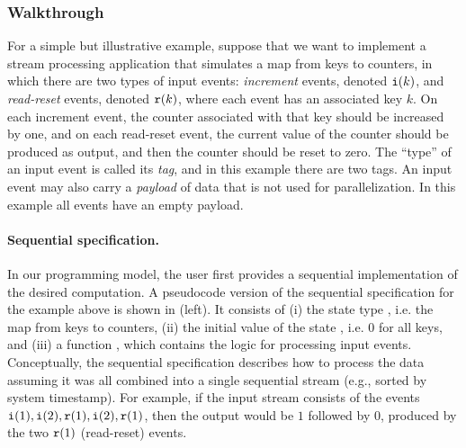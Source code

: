 \subsubsection{Walkthrough}

For a simple but illustrative example, suppose that we want to
implement a stream processing application that simulates a map from
keys to counters, in which there are two types of input events: \emph{increment}
events, denoted $\texttt{i}(k)$, and \emph{read-reset} events, denoted
$\texttt{r}(k)$, where each event has an associated key $k$.  On each
increment event, the counter associated with that key should be
increased by one, and on each read-reset event, the current value of
the counter should be produced as output, and then the counter should be reset to
zero.
The ``type'' of an input event is called its \emph{tag}, and in this example there are
two tags.
An input event may also carry a \emph{payload} of data that is not
used for parallelization. In this example all events have an empty payload.

\paragraph{Sequential specification.}
\label{p:seq-impl}
In our programming model, the user first provides a sequential
implementation of the desired computation.
A pseudocode version of the sequential specification for the
example above is shown in  (left). It consists of
(i) the state type , i.e. the map from keys to
counters, (ii) the initial value of the state ,
i.e. $0$ for all keys, and (iii) a function ,
which contains the logic for processing input events.
Conceptually, the sequential specification describes how to process
the data assuming it was all combined into a single sequential stream (e.g.,
sorted by system timestamp).  For example, if the input stream
consists of the events $\texttt{i}(1), \texttt{i}(2), \texttt{r}(1), \texttt{i}(2),
\texttt{r}(1)$, then the output would be $1$ followed by $0$, produced by
the two $\texttt{r}(1)$ (read-reset) events.

